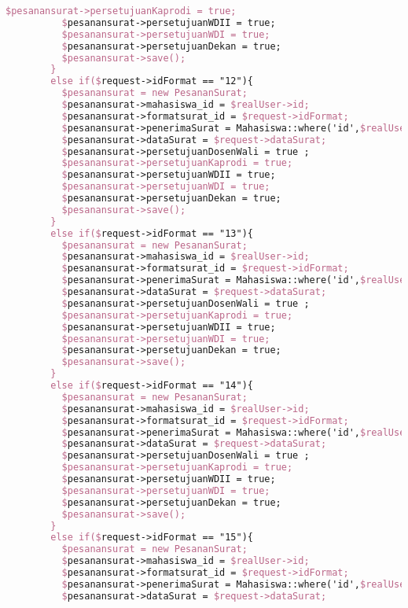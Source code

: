 \begin{lstlisting}[language=tex,basicstyle=\tiny,caption=PesanansuratController.php]
          $pesanansurat->persetujuanKaprodi = true;
          $pesanansurat->persetujuanWDII = true;
          $pesanansurat->persetujuanWDI = true;
          $pesanansurat->persetujuanDekan = true;
          $pesanansurat->save();
        }
        else if($request->idFormat == "12"){
          $pesanansurat = new PesananSurat;
          $pesanansurat->mahasiswa_id = $realUser->id;
          $pesanansurat->formatsurat_id = $request->idFormat;
          $pesanansurat->penerimaSurat = Mahasiswa::where('id',$realUser->id)->first()->dosen->nama_dosen;
          $pesanansurat->dataSurat = $request->dataSurat;
          $pesanansurat->persetujuanDosenWali = true ;
          $pesanansurat->persetujuanKaprodi = true;
          $pesanansurat->persetujuanWDII = true;
          $pesanansurat->persetujuanWDI = true;
          $pesanansurat->persetujuanDekan = true;
          $pesanansurat->save();
        }
        else if($request->idFormat == "13"){
          $pesanansurat = new PesananSurat;
          $pesanansurat->mahasiswa_id = $realUser->id;
          $pesanansurat->formatsurat_id = $request->idFormat;
          $pesanansurat->penerimaSurat = Mahasiswa::where('id',$realUser->id)->first()->dosen->nama_dosen;
          $pesanansurat->dataSurat = $request->dataSurat;
          $pesanansurat->persetujuanDosenWali = true ;
          $pesanansurat->persetujuanKaprodi = true;
          $pesanansurat->persetujuanWDII = true;
          $pesanansurat->persetujuanWDI = true;
          $pesanansurat->persetujuanDekan = true;
          $pesanansurat->save();
        }
        else if($request->idFormat == "14"){
          $pesanansurat = new PesananSurat;
          $pesanansurat->mahasiswa_id = $realUser->id;
          $pesanansurat->formatsurat_id = $request->idFormat;
          $pesanansurat->penerimaSurat = Mahasiswa::where('id',$realUser->id)->first()->dosen->nama_dosen;
          $pesanansurat->dataSurat = $request->dataSurat;
          $pesanansurat->persetujuanDosenWali = true ;
          $pesanansurat->persetujuanKaprodi = true;
          $pesanansurat->persetujuanWDII = true;
          $pesanansurat->persetujuanWDI = true;
          $pesanansurat->persetujuanDekan = true;
          $pesanansurat->save();
        }
        else if($request->idFormat == "15"){
          $pesanansurat = new PesananSurat;
          $pesanansurat->mahasiswa_id = $realUser->id;
          $pesanansurat->formatsurat_id = $request->idFormat;
          $pesanansurat->penerimaSurat = Mahasiswa::where('id',$realUser->id)->first()->dosen->nama_dosen;
          $pesanansurat->dataSurat = $request->dataSurat;

\end{lstlisting}
